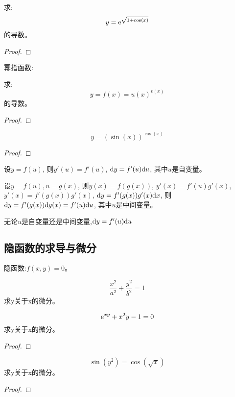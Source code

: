 \begin{proposition}
    求:
    \[ y = \mathrm{e}^{\sqrt{1+\cos(x)}} \]
    的导数。
\end{proposition}
\begin{proof}
    
\end{proof}

幂指函数:
\begin{example}
    求:
    \[ y = f(x) = u(x)^{v(x)} \]
    的导数。
\end{example}
\begin{proof}
    
\end{proof}

\begin{example}
    \[ y = \left(\sin(x)\right)^{\cos(x)}\]
\end{example}
\begin{proof}
    
\end{proof}

\begin{theorem}[一阶微分的形式不变性]
    设$y = f(u)$, 则$y'(u) = f'(u)$, $\mathrm{d} y = f'(u) \mathrm{d} u$, 其中$u$是自变量。

    设$y = f(u), u = g(x)$, 则$y(x) = f(g(x))$, $y'(x) = f'(u)g'(x)$, $y'(x) = f'(g(x))g'(x)$, $\mathrm{d} y = f'(g(x))g'(x) \mathrm{d} x$, 则
    $\mathrm{d} y = f'(g(x)) \mathrm{d} g(x) = f'(u)\mathrm{d} u$, 其中$u$是中间变量。

    无论$u$是自变量还是中间变量,$\mathrm{d} y = f'(u)\mathrm{d} u$
\end{theorem}

\subsection{隐函数的求导与微分}
隐函数:$f(x, y) = 0$。
\begin{example}
    \begin{equation*}
        \frac{x^2}{a^2} + \frac{y^2}{b^2} = 1
    \end{equation*}
    求y关于x的微分。
\end{example}

\begin{example}
    \[ \mathrm{e}^{xy} + x^2y - 1 = 0 \]
    求y关于x的微分。
\end{example}
\begin{proof}
    
\end{proof}

\begin{proposition}
    \[ \sin(y^2) = \cos(\sqrt{x}) \] 
    求y关于x的微分。
\end{proposition}
\begin{proof}
    
\end{proof}

